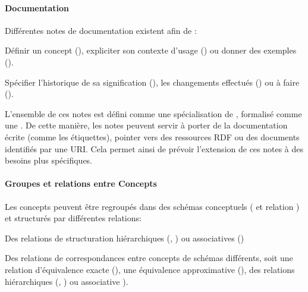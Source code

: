 \paragraph{Documentation}
Différentes notes de documentation existent afin de :
\begin{liste}
	\item Définir un concept (), expliciter son contexte d'usage () ou donner des exemples ().
	\item Spécifier l'historique de sa signification (), les changements effectués () ou à faire ().
\end{liste}
L'ensemble de ces notes est défini comme une spécialisation de , formalisé comme une . 
De cette manière, les notes peuvent servir à porter de la documentation écrite (comme les étiquettes), pointer vers des ressources RDF ou des documents identifiés par une URI. 
Cela permet ainsi de prévoir l'extension de ces notes à des besoins plus spécifiques.


\paragraph{Groupes et relations entre Concepts}
Les concepts peuvent être regroupés dans des schémas conceptuels ( et relation ) et structurés par différentes relations:
\begin{liste}
	\item Des relations de structuration hiérarchiques (, ) ou associatives ()
	\item Des relations de correspondances entre concepts de schémas différents, soit une relation d'équivalence exacte (), une équivalence approximative (), des relations hiérarchiques (, ) ou associative ).
\end{liste}




